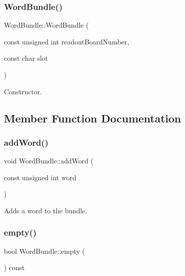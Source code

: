 \subsubsection{\texorpdfstring{Word\+Bundle()}{WordBundle()}}
{\footnotesize\ttfamily Word\+Bundle\+::\+Word\+Bundle (\begin{DoxyParamCaption}\item[{const unsigned int}]{readout\+Board\+Number,  }\item[{const char}]{slot }\end{DoxyParamCaption})}



Constructor. 



\subsection{Member Function Documentation}
\mbox{\label{class_word_bundle_a167d2b6b4f504e4347191a8e5bb47e5e}} 
\subsubsection{\texorpdfstring{add\+Word()}{addWord()}}
{\footnotesize\ttfamily void Word\+Bundle\+::add\+Word (\begin{DoxyParamCaption}\item[{const unsigned int}]{word }\end{DoxyParamCaption})\hspace{0.3cm}{\ttfamily [inline]}}



Adds a word to the bundle. 

\mbox{\label{class_word_bundle_a18bcb8912a877fa9e60cd8ec707e75a3}} 
\subsubsection{\texorpdfstring{empty()}{empty()}}
{\footnotesize\ttfamily bool Word\+Bundle\+::empty (\begin{DoxyParamCaption}{ }\end{DoxyParamCaption}) const\hspace{0.3cm}{\ttfamily [inline]}}



